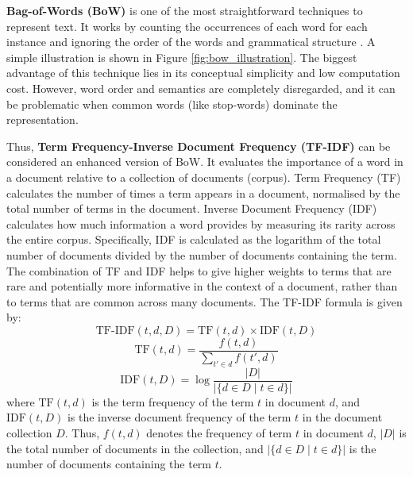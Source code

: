 \textbf{Bag-of-Words (BoW)} is one of the most straightforward techniques to represent text. It works by counting the occurrences of each word for each instance and ignoring the order of the words and grammatical structure \cite{qader-2019-bow}. A simple illustration is shown in Figure \ref{fig:bow_illustration}. The biggest advantage of this technique lies in its conceptual simplicity and low computation cost. However, word order and semantics are completely disregarded, and it can be problematic when common words (like stop-words) dominate the representation.

Thus, \textbf{Term Frequency-Inverse Document Frequency (TF-IDF)} can be considered an enhanced version of BoW. It evaluates the importance of a word in a document relative to a collection of documents (corpus). Term Frequency (TF) calculates the number of times a term appears in a document, normalised by the total number of terms in the document. Inverse Document Frequency (IDF) \cite{jones-2004-idf} calculates how much information a word provides by measuring its rarity across the entire corpus. Specifically, IDF is calculated as the logarithm of the total number of documents divided by the number of documents containing the term. The combination of TF and IDF helps to give higher weights to terms that are rare and potentially more informative in the context of a document, rather than to terms that are common across many documents. The TF-IDF formula is given by:
\begin{equation}
    \text{TF-IDF}(t, d, D) = \text{TF}(t, d) \times \text{IDF}(t, D)
\end{equation}
\begin{equation}
    \text{TF}(t, d) = \frac{f(t, d)}{\sum_{t' \in d} f(t', d)}
\end{equation}
\begin{equation}
    \text{IDF}(t, D) = \log \frac{|D|}{|\{d \in D \mid t \in d\}|}
\end{equation}
where \(\text{TF}(t, d)\) is the term frequency of the term \( t \) in document \( d \), and \(\text{IDF}(t, D)\) is the inverse document frequency of the term \( t \) in the document collection \( D \). Thus, \( f(t, d) \) denotes the frequency of term \( t \) in document \( d \), \( |D| \) is the total number of documents in the collection, and \( |\{d \in D \mid t \in d\}| \) is the number of documents containing the term \( t \).

